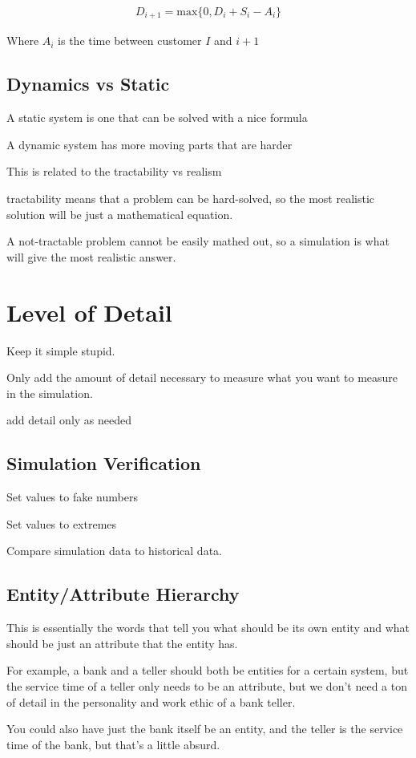 \documentclass[fleqn]{report}
\newcommand{\equations} [1] {
\begin{gather*}
#1
\end{gather*}
}
\begin{document}
\equations{
    D_{i + 1}
    =
    \textrm{max}
    \{
        0, D_{i} + S_{i} - A_{i}    
    \}
}
Where $A_i$ is the time between customer $I$ and $i + 1$ 

\subsection{Dynamics vs Static}

A static system is one that can be solved with a nice formula 

A dynamic system has more moving parts that are harder 

This is related to the tractability vs realism 

tractability means that a problem can be hard-solved, so the most 
realistic solution will be just a mathematical equation. 

A not-tractable problem cannot be easily mathed out, so a simulation is 
what will give the most realistic answer. 

\section{Level of Detail}
Keep it simple stupid. 

Only add the amount of detail necessary to measure what you want to measure 
in the simulation. 

add detail only as needed

\subsection{Simulation Verification}
Set values to fake numbers 

Set values to extremes 

Compare simulation data to historical data. 

\subsection{Entity/Attribute Hierarchy}
This is essentially the words that tell you what should be its own entity 
and what should be just an attribute that the entity has. 

For example, a bank and a teller should both be entities for a certain system, 
but the service time of a teller only needs to be an attribute, but we 
don't need a ton of detail in the personality and work ethic of a bank teller. 

You could also have just the bank itself be an entity, and the teller is 
the service time of the bank, but that's a little absurd. 
\end{document}
